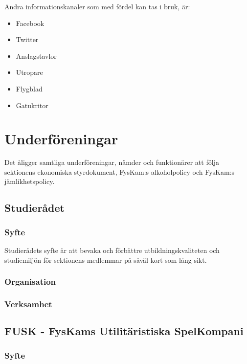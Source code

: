 \documentclass{../resources/dgovdoc}
\begin{document}
Andra informationskanaler som med fördel kan tas i bruk, är:

\begin{itemize}

\item Facebook
\item Twitter
\item Anslagstavlor
\item Utropare
\item Flygblad
\item Gatukritor

\end{itemize}

\section{Underföreningar}

Det åligger samtliga underföreningar, nämder och funktionärer att följa sektionens ekonomiska styrdokument,
FysKam:s alkoholpolicy och FysKam:s jämlikhetspolicy. 

\subsection{Studierådet}

\subsubsection{Syfte}

Studierådets syfte är att bevaka och förbättre utbildningskvaliteten och studiemiljön för sektionens medlemmar på såväl kort som lång sikt.

\subsubsection{Organisation}

\subsubsection{Verksamhet}

\subsection{FUSK - FysKams Utilitäristiska SpelKompani}

\subsubsection{Syfte}
\end{document}

